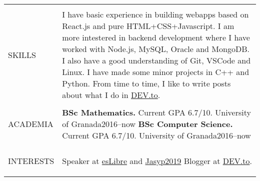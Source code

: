 \documentclass[letterpaper,10pt,oneside]{article}
\newcommand{\DatestampY}[1]{#1}
\newenvironment{body}
{\par\par
\begin{longtable}{p{0.125\textwidth}p{0.84\textwidth}}}
{\par\end{longtable}\par}
\renewcommand{\section}[3]{\\[-0.7cm]\pdfbookmark[2]{#2}{#3}\\%
\raggedleft  %
{\fontsize{9.5pt}{9.5pt}\selectfont\bfseries\raggedright%
\MakeUppercase{#1}}&}
\begin{document}
\begin{body}

\section{Skills}{Skills}{PDF:Skills}

I have basic experience in building webapps based on React.js and pure HTML+CSS+Javascript. I am more intestered in backend development where I have worked with Node.js, MySQL, Oracle and MongoDB. I also have a good understanding of Git, VSCode and Linux. I have made some minor projects in C++ and Python. From time to time, I like to write posts about what I do in \href{https://dev.to/antoniogamiz}{DEV.to}.


\section{Academia}{Academia}{PDF:Academia}

\textbf{BSc Mathematics.} Current GPA 6.7/10. University of Granada\hfill \DatestampY{2016}--\DatestampY{now}\newline
\textbf{BSc Computer Science.} Current GPA 6.7/10. University of Granada\hfill \DatestampY{2016}--\DatestampY{now}


\section{Interests}{Interests}{PDF:Interests}
Speaker at \href{https://github.com/antoniogamiz/discovering-perl6-talk}{esLibre} and \href{https://interferencias.tech/2019/04/20/jasyp-2019/}{Jasyp2019} \newline
Blogger at \href{https://dev.to/antoniogamiz}{DEV.to}.

\end{body}
\end{document}
